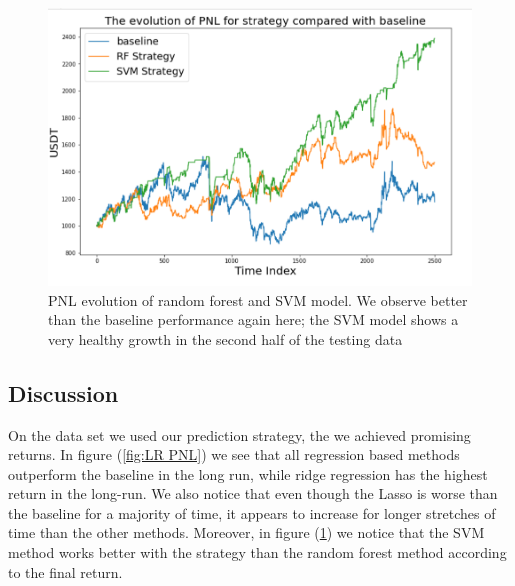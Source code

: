 \documentclass[twoside]{report}
\begin{document}
\begin{spacing}{1}
\begin{figure}
    \centering
    \includegraphics[scale = 0.6]{Images/PNL SVM RF.png}
    \caption{PNL evolution of random forest and SVM model. We observe better than the baseline performance again here; the SVM model shows a very healthy growth in the second half of the testing data}
    \label{fig:SVMRF PNL}
\end{figure}




\subsection{Discussion}
On the data set we used our prediction strategy, the we achieved promising returns. In figure (\ref{fig:LR PNL}) we see that all regression based methods outperform the baseline in the long run, while ridge regression has the highest return in the long-run. We also notice that even though the Lasso is worse than the baseline for a majority of time, it appears to increase for longer stretches of time than the other methods. Moreover, in figure (\ref{fig:SVMRF PNL}) we notice that the SVM method works better with the strategy than the random forest method according to the final return.\\


\end{spacing}
\end{document}
